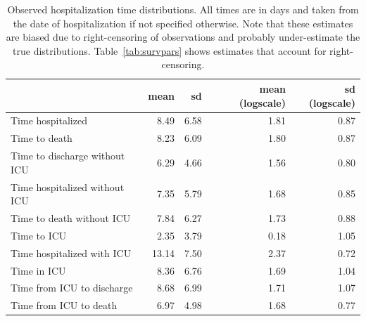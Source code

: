 \begin{table}[t]
\caption[Observed hospitalization time distributions.]{Observed hospitalization time distributions. All times are in days and taken from the date of hospitalization if not specified otherwise. Note that these estimates are biased due to right-censoring of observations and probably under-estimate the true distributions.  Table~\ref{tab:survpars} shows estimates that account for right-censoring.}
\label{tab:vdparams}
\centering
\begin{tabular}{lrrrr}
\toprule
 & mean & sd & mean (logscale) & sd (logscale)\\
\midrule
Time hospitalized & 8.49 & 6.58 & 1.81 & 0.87\\
Time to death & 8.23 & 6.09 & 1.80 & 0.87\\ \addlinespace
Time to discharge without ICU & 6.29 & 4.66 & 1.56 & 0.80\\
Time hospitalized without ICU & 7.35 & 5.79 & 1.68 & 0.85\\
Time to death without ICU & 7.84 & 6.27 & 1.73 & 0.88\\ \addlinespace
Time to ICU & 2.35 & 3.79 & 0.18 & 1.05\\
Time hospitalized with ICU & 13.14 & 7.50 & 2.37 & 0.72\\
Time in ICU & 8.36 & 6.76 & 1.69 & 1.04\\
Time from ICU to discharge & 8.68 & 6.99 & 1.71 & 1.07\\
Time from ICU to death & 6.97 & 4.98 & 1.68 & 0.77\\
\bottomrule
\end{tabular}
\end{table}


